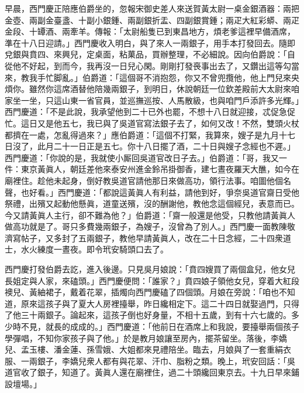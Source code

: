 早晨，西門慶正陪應伯爵坐的，忽報宋御史差人來送賀黃太尉一桌金銀酒器：兩把金壺、兩副金臺盞、十副小銀鍾、兩副銀折盂、四副銀賞鍾；兩疋大紅彩蟒、兩疋金段、十罈酒、兩牽羊。傳報：「太尉船隻已到東昌地方，煩老爹這裡早備酒席，準在十八日迎請。」西門慶收入明白，與了來人一兩銀子，用手本打發回去。隨即兌銀與賁四、來興兒，定桌面，粘菓品，買辦整理，不必細說。因向伯爵說：「自從他不好起，到而今，我再沒一日兒心閑。剛剛打發䘮事出去了，又鑽出這等勾當來，教我手忙脚亂。」{}伯爵道：「這個哥不消抱怨，你又不曾兜攬他，他上門兒來央煩你。雖然你這席酒替他陪幾兩銀子，到明日，休說朝廷一位欽差殿前大太尉來咱家坐一坐，只這山東一省官員，並巡撫巡按、人馬散級，也與咱門戶添許多光輝。」{}西門慶道：「不是此說，我承望他到二十已外也罷，不想十八日就迎接，忒促急促忙。這日又是他五七，我已與了吳道官寫法銀子去了，如何又改！不然，雙頭火杖都擠在一處，怎亂得過來？」應伯爵道：「這個不打緊，我算來，嫂子是九月十七日沒了，此月二十一日正是五七。你十八日擺了酒，二十日與嫂子念經也不遲。」西門慶道：「你說的是，我就使小厮回吳道官改日子去。」伯爵道：「哥，我又一件：東京黃眞人，朝廷差他來泰安州進金鈴吊掛御香，建七晝夜羅天大醮，如今在廟裡住。趁他未起身，倒好教吳道官請他那日來做高功，領行法事。咱圖他個名聲，也好看。」{}西門慶道：「都說這黃眞人有利益，{}請他到好，爭奈吳道官齋日受他祭禮，出殯又起動他懸眞，道童送殯，沒的酬謝他，教他念這個經兒，表意而已。今又請黃眞人主行，卻不難為他？」伯爵道：「齋一般還是他受，只教他請黃眞人做高功就是了。哥只多費幾兩銀子，為嫂子，沒曾為了別人。」{}西門慶一面教陳敬濟寫帖子，又多封了五兩銀子，教他早請黃眞人，改在二十日念經，二十四衆道士，水火練度一晝夜。即令玳安騎頭口去了。

西門慶打發伯爵去訖，進入後邊。只見吳月娘說：「賁四嫂買了兩個盒兒，他女兒長姐定與人家，來磕頭。」西門慶便問：「誰家？」賁四娘子領他女兒，穿着大紅段襖兒、黃紬裙子，戴着花翠，插燭向西門慶磕了四個頭。月娘在旁說：「咱也不知道，原來這孩子與了夏大人房裡擡舉，昨日纔相定下。{}這二十四日就娶過門，只得了他三十兩銀子。論起來，這孩子倒也好身量，不相十五歲，到有十六七歲的。多少時不見，就長的成成的。」西門慶道：「他前日在酒席上和我說，要擡舉兩個孩子學彈唱，不知你家孩子與了他。」於是教月娘讓至房內，擺茶留坐。落後，李嬌兒、孟玉樓、潘金蓮、孫雪娥、大姐都來見禮陪坐。臨去，月娘與了一套重絹衣服、一兩銀子，李嬌兒衆人都有與花翠、汗巾、脂粉之類。晚上，玳安回話：「吳道官收了銀子，知道了。黃眞人還在廟裡住，過二十頭纔回東京去。十九日早來鋪設壇場。」

